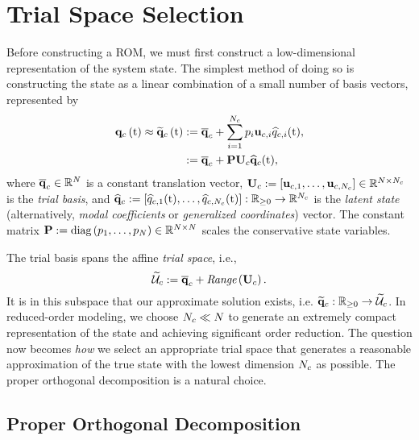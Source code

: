 \section{Trial Space Selection}

Before constructing a ROM, we must first construct a low-dimensional representation of the system state. The simplest method of doing so is constructing the state as a linear combination of a small number of basis vectors, represented by
%
\begin{equation}\label{eq:consSolApprox}
    \begin{aligned}
        \consFunc{\timeVar} \approx \consFuncRom{\timeVar} &\defEq \consVecCent + \sum_{\dummyIdx=1}^{\numConsModes} \consScaleVar_\dummyIdx \consTrialVecIdx \consVarCoefIdx (\timeVar), \\
        &\defEq \consAffineMap(\timeVar),
    \end{aligned}
\end{equation}
%
where $\mathbf{\overline{q}}_c \in \mathbb{R}^{N}$ is a constant translation vector, $\consTrial \defEq \left[\consTrialVec{1},\hdots,\consTrialVec{\numConsModes}\right] \inRTwo{\numDOF}{\numConsModes}$ is the \textit{trial basis}, and $\mathbf{\widehat{q}}_{c} := \left[\widehat{q}_{c,1}(\text{t}),\hdots,\widehat{q}_{c,N_c}(\text{t})\right]: \mathbb{R}_{\ge 0} \rightarrow \mathbb{R}^{N_c}$ is the \textit{latent state} (alternatively, \textit{modal coefficients} or \textit{generalized coordinates}) vector. The constant matrix $\consScale \defEq \text{diag}\left(\consScaleVar_1, \hdots , \consScaleVar_{\numDOF}\right) \inRTwo{\numDOF}{\numDOF}$ scales the conservative state variables.

The trial basis spans the affine \textit{trial space}, i.e.,
%
\begin{equation}
    \consTrialSpace \defEq \consVecCent + \textit{Range}\left(\consTrial\right).
\end{equation}
%
It is in this subspace that our approximate solution exists, i.e. $\funcMap{\consVecRom}{\nonnegReals}{\consTrialSpace}$. In reduced-order modeling, we choose $N_c \ll N$ to generate an extremely compact representation of the state and achieving significant order reduction. The question now becomes \textit{how} we select an appropriate trial space that generates a reasonable approximation of the true state with the lowest dimension $N_c$ as possible. The proper orthogonal decomposition is a natural choice.

\subsection{Proper Orthogonal Decomposition}~\label{subsec:POD}

